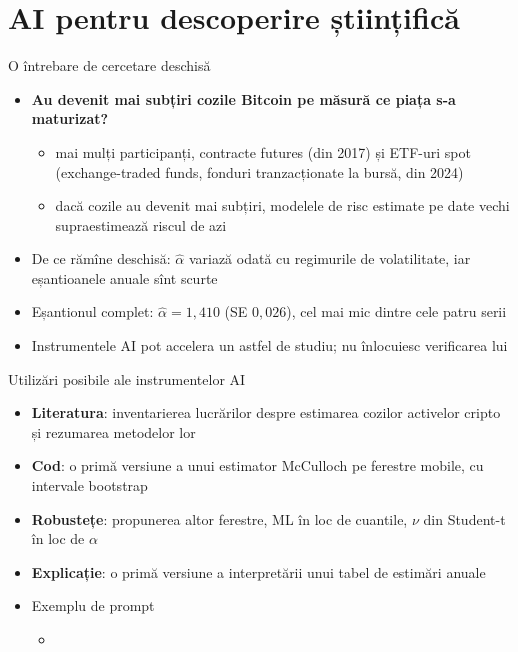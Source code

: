 \section{AI pentru descoperire științifică}

\begin{frame}{O întrebare de cercetare deschisă}
\itemsize{\small}
\begin{itemize}
    \item \textbf{Au devenit mai subțiri cozile Bitcoin pe măsură ce piața s-a maturizat?}
    \begin{itemize}
        \item mai mulți participanți, contracte futures (din 2017) și ETF-uri spot (exchange-traded funds, fonduri tranzacționate la bursă, din 2024)
        \item dacă cozile au devenit mai subțiri, modelele de risc estimate pe date vechi supraestimează riscul de azi
    \end{itemize}
    \item De ce rămîne deschisă: $\hat\alpha$ variază odată cu regimurile de volatilitate, iar eșantioanele anuale sînt scurte
    \item Eșantionul complet: $\hat\alpha = 1{,}410$ (SE $0{,}026$), cel mai mic dintre cele patru serii
    \item Instrumentele AI pot accelera un astfel de studiu; nu înlocuiesc verificarea lui 
\end{itemize}
\end{frame}

\begin{frame}{Utilizări posibile ale instrumentelor AI}
\itemsize{\small}
\begin{itemize}
    \item \textbf{Literatura}: inventarierea lucrărilor despre estimarea cozilor activelor cripto și rezumarea metodelor lor
    \item \textbf{Cod}: o primă versiune a unui estimator McCulloch pe ferestre mobile, cu intervale bootstrap
    \item \textbf{Robustețe}: propunerea altor ferestre, ML în loc de cuantile, $\nu$ din Student-t în loc de $\alpha$
    \item \textbf{Explicație}: o primă versiune a interpretării unui tabel de estimări anuale
    \item Exemplu de prompt
    \begin{itemize}
        \item {}
    \end{itemize}
\end{itemize}
\end{frame}

